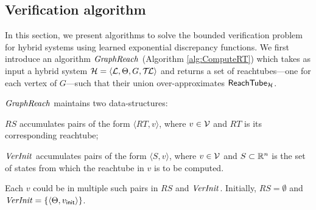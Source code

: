 \subsection{Verification algorithm}
\label{sec:verfication_algorithm}

In this section, we present algorithms to solve the bounded
verification problem for hybrid systems using learned exponential discrepancy functions.
%
We first introduce an algorithm $\mathit{GraphReach}$ (Algorithm
\ref{alg:ComputeRT}) which takes as input a hybrid system ${\mathcal H} =
\langle {\mathcal L}, \Theta, G, \mathcal{T\mkern-3mu L} \rangle$ and returns a set of
reachtubes---one for each vertex of $G$---such that their
union over-approximates ${\sf ReachTube}_{{\mathcal H}}$.
 



$\mathit{GraphReach}$ maintains two  data-structures:
 \begin{inparaenum}[(a)]
\item $RS$ accumulates pairs of the form $\langle RT, v\rangle$, where  $v \in {\mathcal V}$ and $RT$ is its corresponding reachtube;
\item $\mathit{VerInit}$ accumulates pairs of the form $\langle S, v \rangle$,
  where $v \in {\mathcal V}$ and $S\subset \reals^n$ is the set of states  from which the reachtube in $v$ is to be computed.
\end{inparaenum} 
Each
$v$ could be in multiple such pairs in $RS$ and $\mathit{VerInit}$.
%
Initially, $RS = \emptyset$  and
$\mathit{VerInit} = \{\langle \Theta, v_{\sf init}\rangle\}$.


